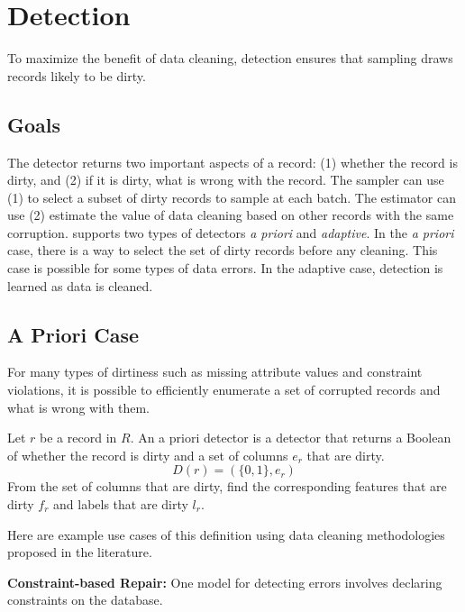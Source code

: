 \section{Detection}\label{det}
To maximize the benefit of data cleaning, detection ensures that sampling draws records likely to be dirty.

\subsection{Goals}
The detector returns two important aspects of a record: (1) whether the record is dirty, and (2) if it is dirty, what is wrong with the record.
The sampler can use (1) to select a subset of dirty records to sample at each batch. 
The estimator can use (2) estimate the value of data cleaning based on other records with the same corruption.
\sys supports two types of detectors \emph{a priori} and \emph{adaptive}.
In the \emph{a priori} case, there is a way to select the set of dirty records before any cleaning.
This case is possible for some types of data errors.
In the adaptive case, detection is learned as data is cleaned.

\subsection{A Priori Case}
For many types of dirtiness such as missing attribute values and constraint violations, it is possible to efficiently enumerate a set of corrupted records and what is wrong with them.

\begin{definition}
Let $r$ be a record in $R$. An a priori detector is a detector that returns a Boolean of whether the record is dirty and a set of columns $e_r$ that are dirty.
\[
D(r) = (\{0,1\}, e_r)
\]
From the set of columns that are dirty, find the corresponding features that are dirty $f_r$ and labels that are dirty $l_r$.
\end{definition}

\noindent Here are example use cases of this definition using data cleaning methodologies proposed in the literature.

\vspace{0.5em}

\noindent\textbf{Constraint-based Repair: }
One model for detecting errors involves declaring constraints on the database.

\vspace{0.5em}

